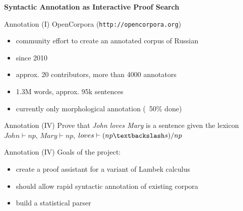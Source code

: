 \documentclass{beamer}
\begin{document}
\begin{frame}{}
\begin{center}
	\textbf{Syntactic Annotation as Interactive Proof Search}
\end{center}
\end{frame}

\begin{frame}{Annotation (I)}
OpenCorpora (\texttt{http://opencorpora.org})\\
\bigskip
\begin{itemize}
    \item community effort to create an annotated corpus of Russian
    \item since 2010
    \item approx. 20 contributors, more than 4000 annotators
    \item 1.3M words, approx. 95k sentences
    \item currently only morphological annotation (~50\% done)
\end{itemize}
\end{frame}


\begin{frame}{Annotation (IV)}
Prove that \textit{John loves Mary} is a sentence given the lexicon\\
\medskip
$John \vdash np$, $Mary \vdash np$, $loves \vdash (np \textbackslash s)/np$

\begin{prooftree}
\end{prooftree}
\end{frame}

\begin{frame}{Annotation (IV)}
Goals of the project:\\
\bigskip
\begin{itemize}
    \item create a proof assistant for a variant of Lambek calculus
    \item should allow rapid syntactic annotation of existing corpora
    \item build a statistical parser
\end{itemize}
\end{frame}
\end{document}
